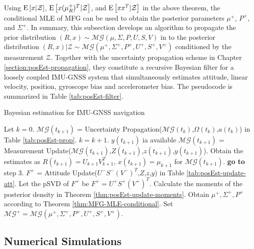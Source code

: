 Using $\mathrm{E}\left[ x|\mathcal{Z} \right]$, $\mathrm{E}\left[ x(\mu_R^+)^T|\mathcal{Z} \right]$, and $\mathrm{E}\left[ xx^T|\mathcal{Z} \right]$ in the above theorem, the conditional MLE of MFG can be used to obtain the posterior parameters $\mu^+$, $P^+$, and $\Sigma^+$.
In summary, this subsection develops an algorithm to propagate the prior distribution $(R,x) \sim \mathcal{MG}(\mu,\allowbreak \Sigma,\allowbreak P,\allowbreak U,\allowbreak S,\allowbreak V)$ in to the posterior distribution $(R,x)|\mathcal{Z} \sim \mathcal{MG}(\mu^+,\allowbreak \Sigma^+,\allowbreak P^+,\allowbreak U^+,\allowbreak S^+,\allowbreak V^+)$ conditioned by the measurement $\mathcal{Z}$.
Together with the uncertainty propagation scheme in Chapter \ref{section:posEst-propagation}, they constitute a recursive Bayesian filter for a loosely coupled IMU-GNSS system that simultaneously estimates attitude, linear velocity, position, gyroscope bias and accelerometer bias.
The pseudocode is summarized in Table \ref{tab:posEst-filter}.

\begin{table}
	\caption{Bayesian estimation for IMU-GNSS navigation \label{tab:posEst-filter}}
	\begin{algorithmic}[1]
		\algrule[0.8pt]
		\algrule
		\State Let $k=0$.
		\Repeat
		\State $\mathcal{MG}(t_{k+1})$ = Uncertainty Propagation($\mathcal{MG}(t_k)$,$\Omega(t_k)$,$a(t_k)$) in Table \ref{tab:posEst-prop}.
		\State $k=k+1$.
		\Until $y(t_{k+1})$ ia available
		\State $\mathcal{MG}(t_{k+1})$ = Measurement Update($\mathcal{MG}(t_{k+1})$,$Z(t_{k+1})$,$z(t_{k+1})$,$y(t_{k+1})$).
		\State Obtain the estimates as $R(t_{k+1})=U_{k+1}V_{k+1}^T$, $x(t_{k+1})=\mu_{k+1}$ for $\mathcal{MG}(t_{k+1})$.
		\State \textbf{go to} step 3.
		\EndProcedure
		\algrule
		\State $F^+$ = Attitude Update($U^-S^-(V^-)^T$,$Z$,$z$,$y$) in Table \ref{tab:posEst-update-att}.
		\State Let the pSVD of $F^+$ be $F^+ = U^+S^+(V^+)^T$.
		\State Calculate the moments of the posterior density in Theorem \ref{thm:posEst-update-moments}.
		\State Obtain $\mu^+,\Sigma^+,P^+$ according to Theorem \ref{thm:MFG-MLE-conditional}.
		\State Set $\mathcal{MG}^+ = \mathcal{MG}(\mu^+,\Sigma^+,P^+,U^+,S^+,V^+)$.
		\EndProcedure
		\algrule[0.8pt]
	\end{algorithmic}
\end{table}

\subsection{Numerical Simulations}

